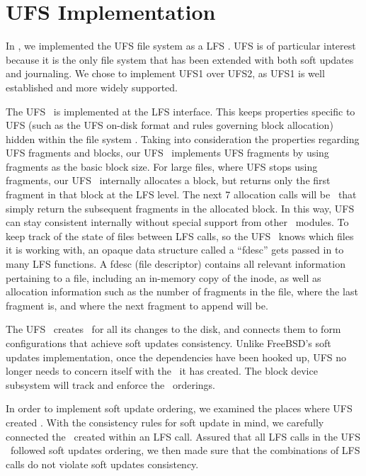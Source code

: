 \section{UFS Implementation}
\label{sec:implementation}

In \Kudos, we implemented the UFS file system as a LFS \module. UFS is of
particular interest because it is the only file system that has been extended
with both soft updates and journaling. We chose to implement UFS1 over UFS2,
as UFS1 is well established and more widely supported.

The UFS \module\ is implemented at the LFS interface. This keeps properties
specific to UFS (such as the UFS on-disk format and rules governing block
allocation) hidden within the file system \module. Taking into consideration
the properties regarding UFS fragments and blocks, our UFS \module\ implements
UFS fragments by using fragments as the basic block size. For large files,
where UFS stops using fragments, our UFS \module\ internally allocates a
block, but returns only the first fragment in that block at the LFS level. The
next 7 allocation calls will be \noops\ that simply return the subsequent
fragments in the allocated block. In this way, UFS can stay consistent
internally without special support from other \Kudos\ modules. To keep track
of the state of files between LFS calls, so the UFS \module\ knows which files
it is working with, an opaque data structure called a ``fdesc'' gets passed in
to many LFS functions. A fdesc (file descriptor) contains all relevant
information pertaining to a file, including an in-memory copy of the inode, as
well as allocation information such as the number of fragments in the file,
where the last fragment is, and where the next fragment to append will be.

The UFS \module\ creates \chdescs\ for all its changes to the disk, and
connects them to form configurations that achieve soft updates consistency.
Unlike FreeBSD's soft updates implementation, once the dependencies have been
hooked up, UFS no longer needs to concern itself with the \chdescs\ it has
created. The block device subsystem will track and enforce the
\chdesc\ orderings.

In order to implement soft update ordering, we examined the places where UFS
created \chdescs. With the consistency rules for soft update in mind, we
carefully connected the \chdescs\ created within an LFS call. Assured that
all LFS calls in the UFS \module\ followed soft updates ordering, we then made
sure that the combinations of LFS calls do not violate soft updates
consistency.

